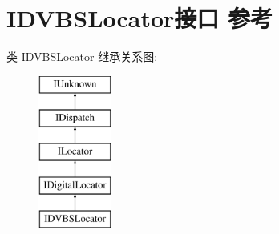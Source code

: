 \hypertarget{interface_i_d_v_b_s_locator}{}\section{I\+D\+V\+B\+S\+Locator接口 参考}
\label{interface_i_d_v_b_s_locator}
类 I\+D\+V\+B\+S\+Locator 继承关系图\+:\begin{figure}[H]
\begin{center}
\leavevmode
\includegraphics[height=5.000000cm]{interface_i_d_v_b_s_locator}
\end{center}
\end{figure}
